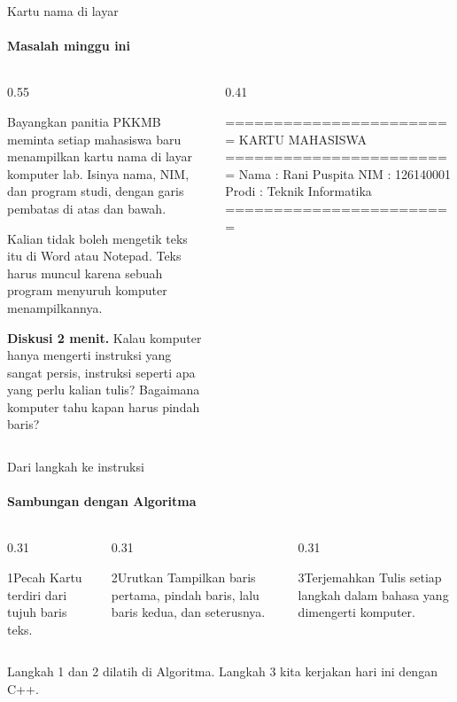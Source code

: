 \documentclass[t]{beamer}
\begin{document}
\begin{frame}[fragile]{Kartu nama di layar}
\framesubtitle{Masalah minggu ini}
\begin{columns}[T]
\begin{column}{0.55\textwidth}
{\small Bayangkan panitia PKKMB meminta setiap mahasiswa baru menampilkan kartu nama di layar komputer lab. Isinya nama, NIM, dan program studi, dengan garis pembatas di atas dan bawah.

\vspace{6pt}
Kalian tidak boleh mengetik teks itu di Word atau Notepad. Teks harus muncul karena sebuah program menyuruh komputer menampilkannya.\par}
\vspace{6pt}
\begin{Catatan}
\textbf{Diskusi 2 menit.} Kalau komputer hanya mengerti instruksi yang sangat persis, instruksi seperti apa yang perlu kalian tulis? Bagaimana komputer tahu kapan harus pindah baris?
\end{Catatan}
\end{column}
\begin{column}{0.41\textwidth}
\begin{Keluaran}[]
========================
    KARTU MAHASISWA
========================
Nama  : Rani Puspita
NIM   : 126140001
Prodi : Teknik Informatika
========================
\end{Keluaran}
\end{column}
\end{columns}
\end{frame}

\begin{frame}{Dari langkah ke instruksi}
\framesubtitle{Sambungan dengan Algoritma}
\begin{columns}[T]
\begin{column}{0.31\textwidth}
\begin{Langkah}{1}{Pecah}
Kartu terdiri dari tujuh baris teks.
\end{Langkah}
\end{column}
\begin{column}{0.31\textwidth}
\begin{Langkah}{2}{Urutkan}
Tampilkan baris pertama, pindah baris, lalu baris kedua, dan seterusnya.
\end{Langkah}
\end{column}
\begin{column}{0.31\textwidth}
\begin{Langkah}{3}{Terjemahkan}
Tulis setiap langkah dalam bahasa yang dimengerti komputer.
\end{Langkah}
\end{column}
\end{columns}
\vspace{10pt}
Langkah 1 dan 2 dilatih di Algoritma. Langkah 3 kita kerjakan hari ini dengan C++.
\end{frame}
\end{document}
